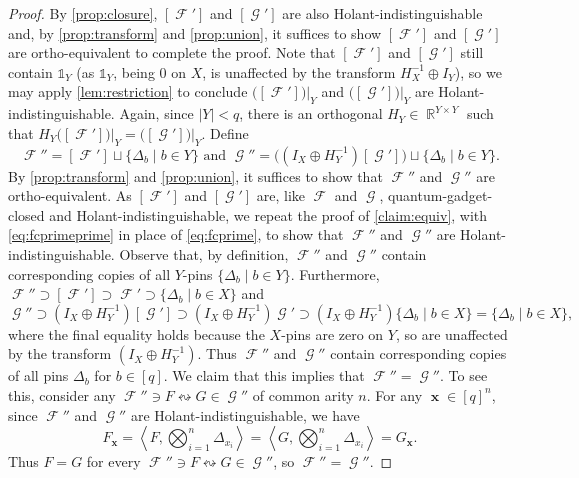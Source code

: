 \documentclass{article}
\DeclareMathOperator{\rr}{\mathbb{R}}
\DeclareMathOperator{\vx}{\mathbf{x}}
\DeclareMathOperator{\fc}{\mathcal{F}}
\DeclareMathOperator{\gc}{\mathcal{G}}
\begin{document}
\begin{proof}
    By \autoref{prop:closure}, $[\fc']$ and $[\gc']$ are also Holant-indistinguishable
    and, by \autoref{prop:transform} and \autoref{prop:union}, 
    it suffices to show $[\fc']$ and $[\gc']$ are
    ortho-equivalent to complete the proof. 
    Note that $[\fc']$ 
    and $[\gc']$ still contain $\mathds{1}_Y$ (as $\mathds{1}_Y$, being 0 on $X$, is unaffected
    by the transform $H_X^{-1} \oplus I_Y$), so we may
    apply \autoref{lem:restriction} to conclude
    $\big([\fc']\big)\big|_Y$ and $\big([\gc']\big)\big|_Y$ are Holant-indistinguishable. 
    Again, since $|Y| < q$, there is an orthogonal
    $H_Y \in \rr^{Y \times Y}$ such that $H_Y\big([\fc']\big)\big|_Y = \big([\gc']\big)\big|_Y$. Define
    \begin{equation}
        \fc'' = [\fc'] \sqcup \{\Delta_b \mid b \in Y\} \text{ and }
        \gc'' = \big((I_X \oplus H_Y^{-1}) [\gc'] \big) \sqcup \{\Delta_b \mid b \in Y\}.
    \label{eq:fcprimeprime}
    \end{equation}
    By \autoref{prop:transform} and \autoref{prop:union}, it suffices to show that $\fc''$ and $\gc''$
    are ortho-equivalent. 
    As $[\fc']$ and $[\gc']$ are, like $\fc$ and $\gc$, quantum-gadget-closed and 
    Holant-indistinguishable, we repeat the proof of \autoref{claim:equiv},
    with \eqref{eq:fcprimeprime} in place of \eqref{eq:fcprime}, to show that
    $\fc''$ and $\gc''$ are Holant-indistinguishable.
    Observe that, by definition, $\fc''$ and $\gc''$ contain corresponding
    copies of all $Y$-pins $\{\Delta_b \mid b \in Y\}$.
    Furthermore, $\fc'' \supset [\fc'] \supset \fc' \supset \{\Delta_b \mid b \in X\}$
    and 
    \[
        \gc'' \supset (I_X \oplus H_Y^{-1})[\gc'] \supset (I_X \oplus H_Y^{-1})\gc' \supset (I_X \oplus H_Y^{-1})\{\Delta_b \mid b \in X\} = \{\Delta_b \mid b \in X\},
    \]
    where the final equality holds because the $X$-pins are zero on $Y$, so are unaffected by the
    transform $(I_X \oplus H_Y^{-1})$. Thus $\fc''$ and $\gc''$ contain corresponding copies of all
    pins $\Delta_b$ for $b \in [q]$. 
    We claim that this implies that $\fc'' = \gc''$.
    To see this, consider any $\fc'' \ni F \leftrightsquigarrow G \in \gc''$
    of common arity $n$. For any $\vx \in [q]^n$, since $\fc''$ and $\gc''$ are Holant-indistinguishable, 
    we have
    \[
        F_{\vx} = \left\langle F,\bigotimes_{i=1}^n \Delta_{x_i} \right\rangle 
        = \left\langle G,\bigotimes_{i=1}^n \Delta_{x_i} \right\rangle = G_{\vx}.
    \]
    Thus $F = G$ for every $\fc'' \ni F \leftrightsquigarrow G \in \gc''$, so $\fc'' = \gc''$.
\end{proof}
\end{document}
